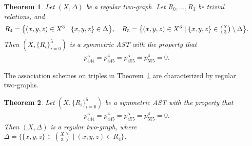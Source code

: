 \documentclass[11pt,oneside]{amsart}
\newtheorem{theorem}{Theorem}[section]
\begin{document}
{\begin{theorem} \cite{MR1075708}\label{thm:astrt} %
 Let $(X,\Delta)$ be a regular two-graph. Let  $R_0,\ldots,R_3$  be  trivial relations, and
\begin{align*}
    R_4=\big\{(x,y,z)\in X^3\mid \{x,y,z\} \in \Delta\big\},\quad R_5=\big\{(x,y,z)\in X^3\mid \{x,y,z\} \in \tbinom{X}{3}\setminus \Delta\big\}. 
\end{align*}    
 Then  $(X,\{R_i\}_{i=0}^5)$   is a symmetric AST with the property that 
    \begin{align*}
    p_{444}^5=p_{445}^4=p_{455}^5=p_{555}^4=0.
    \end{align*}
\end{theorem}
The association schemes on triples in Theorem~\ref{thm:astrt} are characterized by regular two-graphs.  
\begin{theorem}\cite{MR1075708}\label{thm:astrt2} 
    Let $(X,\{R_i\}_{i=0}^5)$ be a symmetric AST
with the property that 
    \begin{align*}
    p_{444}^5=p_{445}^4=p_{455}^5=p_{555}^4=0.
    \end{align*}
   Then  $(X,\Delta)$ is a regular two-graph, where $\Delta=\big\{\{x,y,z\}\in\binom{X}{3} \mid (x,y,z)\in R_4\big\}$.  
\end{theorem}


}
\end{document}

